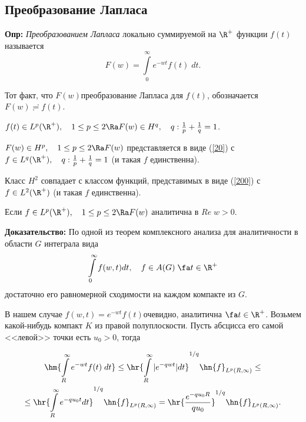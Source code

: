 \documentclass[a4paper]{article}
\begin{document}
\subsection{Преобразование Лапласа}
\textbf{Опр:} \emph{Преобразованием Лапласа} локально суммируемой
на $\R ^{+}$ функции $f(t)$ называется
\begin{equation}\label{200}
F(w)=\int\limits_0^{\infty} e^{-wt}f(t)\;dt.
\end{equation}

Тот факт, что $F(w)$\т преобразование Лапласа для $f(t)$,
обозначается $F(w)\risingdotseq f(t)$.

\begin{theorems}\label{2.9}
$f(t)\in L^p(\R ^{+}),\quad1\le p\le2\Ra F(w)\in
H^{q},\quad q:\frac1p+\frac1q=1$.
\end{theorems}

\begin{theorems}\label{2.10}
$F(w)\in H^p,\quad1\le p\le2\Ra F(w)$ представляется в
виде (\ref{20}) с $f\in L^q(\R ^{+}),\quad
q:\frac1p+\frac1q=1$ (и такая $f$ единственна).
\end{theorems}

\begin{sled}
Класс $H^2$ совпадает с классом функций, представимых в виде (\ref{200}) с $f\in L^2(\R ^{+})$ (и
такая $f$ единственна).
\end{sled}

\begin{theorems}
Если $f\in L^p(\R ^{+}),\quad1\le p\le2\Ra F(w)$
аналитична в $Re\;w>0$.
\end{theorems}
\textbf{Доказательство:} По одной из теорем комплексного анализа
для аналитичности в области $G$ интеграла вида
$$\int\limits_0^{\infty}f(w,t)dt,\quad f\in A(G)\;\fa t\in\R ^{+}$$
достаточно его равномерной сходимости на каждом компакте из $G$.

\begin{wrapfigure}[7]{l}{155pt}
\end{wrapfigure}

В нашем случае $f(w,t)=e^{-wt}f(t)$\т очевидно, аналитична
$\fa t\in\R ^{+}$. Возьмем какой-нибудь компакт $K$ из
правой полуплоскости. Пусть абсцисса его самой <<левой>> точки
есть $u_0>0$, тогда

\begin{multline*}
\hm{\int\limits_R^{\infty}e^{-wt}f(t)\;dt}\le\hr{\int\limits_R^{\infty}|e^{-qwt}|dt}^{1/q}\hn{f}_{L^p(R,\infty)}\le\\
\le\hr{\int\limits_R^{\infty}e^{-qu_0t}dt}^{1/q}\hn{f}_{L^p(R,\infty)}=\hr{\frac{e^{-qu_0R}}{qu_0}}^{1/q}\hn{f}_{L^p(R,\infty)}.
\end{multline*}
\end{document}
